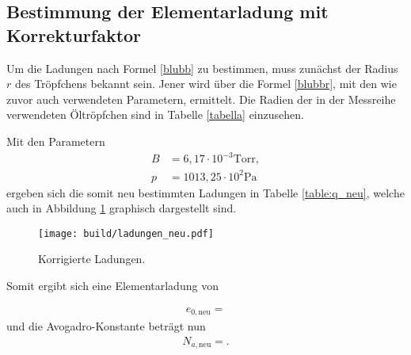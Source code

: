 \subsection{Bestimmung der Elementarladung mit Korrekturfaktor}

Um die Ladungen nach Formel \eqref{blubb} zu bestimmen, muss zunächst der Radius $r$ des Tröpfchens bekannt sein.
Jener wird über die Formel \eqref{blubbr}, mit den wie zuvor auch verwendeten Parametern, ermittelt.
Die Radien der in der Messreihe verwendeten Öltröpfchen sind in Tabelle \ref{tabella} einzusehen.



Mit den Parametern \cite{skript} \cite{normaldruck}
\begin{align*}
  B &= 6,17\cdot 10^{-3}\text{Torr},\\
  p &= 1013,25\cdot10^2\si{\pascal}
\end{align*}
ergeben sich die somit neu bestimmten Ladungen in Tabelle \ref{table:q_neu}, welche auch in Abbildung \ref{plot:2} graphisch dargestellt sind.




\begin{figure}
  \centering
  \texttt{[image: build/ladungen\_neu.pdf]}
  \caption{Korrigierte Ladungen.}
  \label{plot:2}
\end{figure}

Somit ergibt sich eine Elementarladung von

\begin{align*}
  e_{0,\text{neu}} = 
\end{align*}
und die Avogadro-Konstante beträgt nun
\begin{align*}
  N_{a,\text{neu}} = .
\end{align*}




